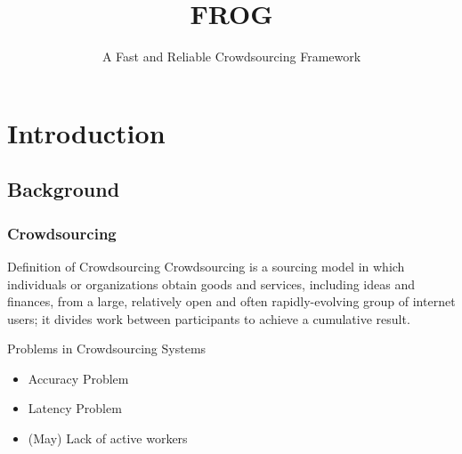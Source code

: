 \documentclass[UTF8]{beamer}
\begin{document}
\title{FROG}
\subtitle{A Fast and Reliable Crowdsourcing Framework}
\author{ }
\institute{ }
\date{ }

\beamertemplatenavigationsymbolsempty

\frame{\titlepage}

\frame{\tableofcontents}


\section{Introduction}

\subsection{Background}
\begin{frame}
    \frametitle{Crowdsourcing}
    
    \begin{block}{Definition of Crowdsourcing}
        Crowdsourcing is a sourcing model in which 
        individuals or organizations obtain goods 
        and services, including ideas and finances, 
        from a large, relatively open and often 
        rapidly-evolving group of internet users; 
        it divides work between participants to 
        achieve a cumulative result.
    \end{block}

    \begin{block}{Problems in Crowdsourcing Systems}
        \begin{itemize}
            \item Accuracy Problem
            \item Latency Problem
            \item (May) Lack of active workers
        \end{itemize}
    \end{block}
\end{frame}
\end{document}
